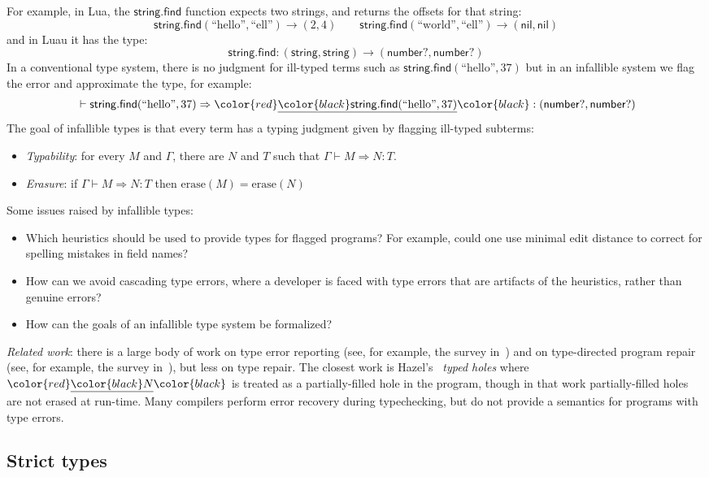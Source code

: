 \documentclass[acmsmall]{acmart}
\newcommand{\squnder}[1]{\color{red}\underline{{\color{black}#1}}\color{black}}
\newcommand{\erase}{\mathrm{erase}}
\newcommand{\NIL}{\mathsf{nil}}
\newcommand{\NUMBER}{\mathsf{number}}
\newcommand{\STRING}{\mathsf{string}}
\newcommand{\FIND}{\mathsf{find}}
\newcommand{\strlit}[1]{\mbox{``#1''}}
\begin{document}
For example, in Lua, the $\STRING.\FIND$ function expects two strings, and returns the
offsets for that string:
\[
  \STRING.\FIND(\strlit{hello}, \strlit{ell}) \rightarrow (2, 4)
\qquad
  \STRING.\FIND(\strlit{world}, \strlit{ell}) \rightarrow (\NIL, \NIL)
\]
and in Luau it has the type:
\[
  \STRING.\FIND : (\STRING, \STRING) \rightarrow (\NUMBER?, \NUMBER?)
\]
In a conventional type system, there is no judgment for ill-typed terms
such as $\STRING.\FIND(\strlit{hello}, 37)$ but in an infallible system we flag the error
and approximate the type, for example:
\[
  {} \vdash
  \STRING.\FIND(\strlit{hello}, 37)
  \Rightarrow
  \squnder{\STRING.\FIND(\strlit{hello}, 37)}
  :
  (\NUMBER?, \NUMBER?)
\]
The goal of infallible types is that every term has a typing judgment
given by flagging ill-typed subterms:
\begin{itemize}
\item \emph{Typability}: for every $M$ and $\Gamma$,
  there are $N$ and $T$ such that $\Gamma \vdash M \Rightarrow N : T$.
\item \emph{Erasure}: if $\Gamma \vdash M \Rightarrow N : T$
  then $\erase(M) = \erase(N)$ 
\end{itemize}
Some issues raised by infallible types:
\begin{itemize}
\item Which heuristics should be used to provide types for flagged programs? For example, could one
  use minimal edit distance to correct for spelling mistakes in field names?
\item How can we avoid cascading type errors, where a developer is
  faced with type errors that are artifacts of the heuristics, rather
  than genuine errors?
\item How can the goals of an infallible type system be formalized?
\end{itemize}
\emph{Related work}:
there is a large body of work on type error reporting
(see, for example, the survey in~\cite[Ch.~3]{TopQuality})
and on type-directed program repair
(see, for example, the survey in~\cite[Ch.~3]{RepairingTypeErrors}),
but less on type repair.
The closest work is Hazel's~\cite{Hazel} \emph{typed holes}
where $\squnder{N}$ is treated as a partially-filled hole in the program,
though in that work partially-filled holes are not erased at run-time.
Many compilers perform
error recovery during typechecking, but do not provide a semantics
for programs with type errors.

\subsection{Strict types}
\end{document}
